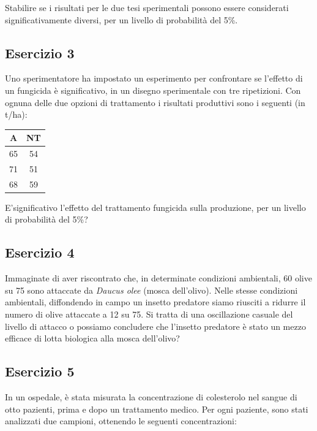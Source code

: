 \documentclass[a4paper,12pt,oneside]{book}
\begin{document}
Stabilire se i risultati per le due tesi sperimentali possono essere considerati significativamente diversi, per un livello di probabilità del 5\%.

\hypertarget{esercizio-3-3}{%
\subsection{Esercizio 3}\label{esercizio-3-3}}

Uno sperimentatore ha impostato un esperimento per confrontare se l'effetto di un fungicida è significativo, in un disegno sperimentale con tre ripetizioni. Con ognuna delle due opzioni di trattamento i risultati produttivi sono i seguenti (in t/ha):

\begin{longtable}[]{@{}cc@{}}
\toprule
A & NT \\
\midrule
\endhead
65 & 54 \\
71 & 51 \\
68 & 59 \\
\bottomrule
\end{longtable}

E'significativo l'effetto del trattamento fungicida sulla produzione, per un livello di probabilità del 5\%?

\hypertarget{esercizio-4-2}{%
\subsection{Esercizio 4}\label{esercizio-4-2}}

Immaginate di aver riscontrato che, in determinate condizioni ambientali, 60 olive su 75 sono attaccate da \emph{Daucus olee} (mosca dell'olivo). Nelle stesse condizioni ambientali, diffondendo in campo un insetto predatore siamo riusciti a ridurre il numero di olive attaccate a 12 su 75. Si tratta di una oscillazione casuale del livello di attacco o possiamo concludere che l'insetto predatore è stato un mezzo efficace di lotta biologica alla mosca dell'olivo?

\hypertarget{esercizio-5-2}{%
\subsection{Esercizio 5}\label{esercizio-5-2}}

In un ospedale, è stata misurata la concentrazione di colesterolo nel sangue di otto pazienti, prima e dopo un trattamento medico. Per ogni paziente, sono stati analizzati due campioni, ottenendo le seguenti concentrazioni:
\end{document}
